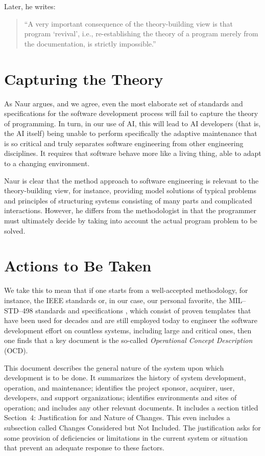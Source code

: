 \documentclass[12pt]{article}
\theoremstyle{plain}
\theoremstyle{definition}
\theoremstyle{remark}
\begin{document}
Later, he writes:
\begin{quote}
  ``A very important consequence of the theory-building view is that
  program `revival', i.e., re-establishing the theory of a program
  merely from the documentation, is strictly impossible.''
\end{quote}

\section{Capturing the Theory}

As Naur argues, and we agree, even the most elaborate set of standards
and specifications for the software development process will fail to
capture the theory of programming. In turn, in our use of AI, this
will lead to AI developers (that is, the AI itself) being unable to
perform specifically the adaptive maintenance that is so critical and
truly separates software engineering from other engineering
disciplines. It requires that software behave more like a living
thing, able to adapt to a changing environment.

Naur is clear that the method approach to software engineering is
relevant to the theory-building view, for instance, providing model
solutions of typical problems and principles of structuring systems
consisting of many parts and complicated interactions. However, he
differs from the methodologist in that the programmer must ultimately
decide by taking into account the actual program problem to be solved.

\section{Actions to Be Taken}

We take this to mean that if one starts from a well-accepted
methodology, for instance, the IEEE standards or, in our case, our
personal favorite, the MIL--STD--498 standards and
specifications \cite{milstd498}, which consist of proven templates
that have been used for decades and are still employed today to
engineer the software development effort on countless systems,
including large and critical ones, then one finds that a key document
is the so-called \emph{Operational Concept Description} (OCD).

This document describes the general nature of the system upon which
development is to be done. It summarizes the history of system
development, operation, and maintenance; identifies the project
sponsor, acquirer, user, developers, and support organizations;
identifies environments and sites of operation; and includes any other
relevant documents. It includes a section titled Section~4:
Justification for and Nature of Changes. This even includes a
subsection called Changes Considered but Not Included. The
justification asks for some provision of deficiencies or limitations
in the current system or situation that prevent an adequate response to
these factors.
\end{document}
